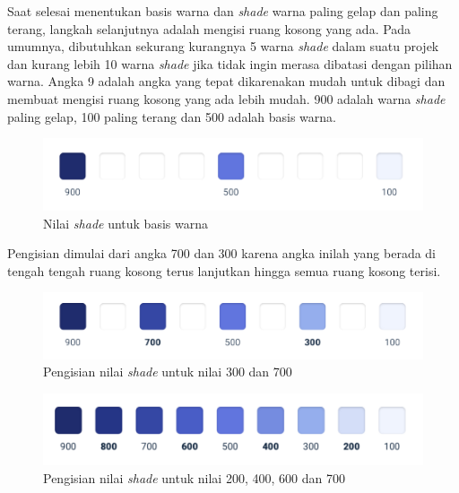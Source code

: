 Saat selesai menentukan basis warna dan \textit{shade} warna paling gelap dan paling terang, langkah selanjutnya adalah mengisi ruang kosong yang ada. Pada umumnya, dibutuhkan sekurang kurangnya 5 warna \textit{shade} dalam suatu projek dan kurang lebih 10 warna \textit{shade} jika tidak ingin merasa dibatasi dengan pilihan warna. Angka 9 adalah angka yang tepat dikarenakan mudah untuk dibagi dan membuat mengisi ruang kosong yang ada lebih mudah. 900 adalah warna \textit{shade} paling gelap, 100 paling terang dan 500 adalah basis warna.

\begin{figure}[H]
	{\centering
		\includegraphics[keepaspectratio, width=12cm]{gambar/refactoring-ui-42.png}
		\caption{Nilai \textit{shade} untuk basis warna \citep{refactoringui}}}
	\label{gambar:refactoring-ui-42.png}
\end{figure}

Pengisian dimulai dari angka 700 dan 300 karena angka inilah yang berada di tengah tengah ruang kosong terus lanjutkan hingga semua ruang kosong terisi.

\begin{figure}[H]
	{\centering
		\includegraphics[keepaspectratio, width=12cm]{gambar/refactoring-ui-43.png}
		\caption{Pengisian nilai \textit{shade} untuk nilai 300 dan 700 \citep{refactoringui}}}
	\label{gambar:refactoring-ui-43.png}
\end{figure}

\begin{figure}[H]
	{\centering
		\includegraphics[keepaspectratio, width=12cm]{gambar/refactoring-ui-44.png}
		\caption{Pengisian nilai \textit{shade} untuk nilai 200, 400, 600 dan 700 \citep{refactoringui}}}
	\label{gambar:refactoring-ui-44.png}
\end{figure}

